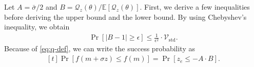 \documentclass[journal]{IEEEtran}
\providecommand{\E}{\mathbb{E}} %
\providecommand{\ind}[1]{\ensuremath{\mathbbm{1}_{\left\{#1\right\}}}} %
\renewcommand{\geq}{\geqslant} %
\renewcommand{\leq}{\leqslant} %
\theoremstyle{definition}
\newcommand{\yohe}[1]{{\color{cyan}Y.A.: #1}}
\begin{document}
Let 
$A = \bar\sigma/2$
and $B = \mathcal{Q}_z(\theta)/\E[\mathcal{Q}_z(\theta)]$.
First, we derive a few inequalities before deriving the upper bound and the lower bound.
By using Chebyshev's inequality, we obtain
\begin{align}
\Pr\left[\left| B - 1 \right|\geq \epsilon\right]
\leq
\frac{1}{\epsilon^2} \cdot \mathcal{V}_\mathrm{std}
.
\end{align}
%
Because of \eqref{eq:q-def}, we can write the success probability as
\begin{equation}
\begin{aligned}[t]
\Pr[ f(m + \sigma z) \leq f(m)]
= \Pr\left[ z_e \leq - A \cdot B\right]
.
\end{aligned}
\end{equation}
\end{document}
